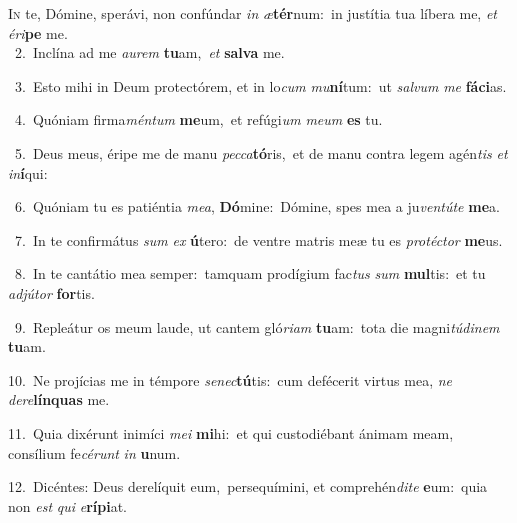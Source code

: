 \lettrine{\initial\textcolor{\initialcolor}{I}}{n} te, Dómine, sperávi, non confúndar \textit{in} \textit{æ}\-\textbf{tér}num:~\star in justítia tua líbera me, \textit{et} \textit{é}\-\textit{ri}\textbf{pe} me.\\
{\numbfont\textcolor{\numbcolor}{~2.}}~Inclína ad me \textit{au}\-\textit{rem} \textbf{tu}\-am,~\star \textit{et} \textbf{sal}\-\textbf{va} me.\par
{\numbfont\textcolor{\numbcolor}{~3.}}~Esto mihi in Deum protectórem, et in lo\textit{cum} \textit{mu}\-\textbf{ní}tum:~\star ut \textit{sal}\-\textit{vum} \textit{me} \textbf{fá}\-\textbf{ci}as.\par
{\numbfont\textcolor{\numbcolor}{~4.}}~Quóniam firma\-\textit{mén}\-\textit{tum} \textbf{me}\-um,~\star et refúgi\textit{um} \textit{me}\-\textit{um} \textbf{es} tu.\par
{\numbfont\textcolor{\numbcolor}{~5.}}~Deus meus, éripe me de manu \textit{pec}\-\textit{ca}\textbf{tó}ris,~\star et de manu contra legem agén\textit{tis} \textit{et} \textit{in}\-\textbf{í}qui:\par
{\numbfont\textcolor{\numbcolor}{~6.}}~Quóniam tu es patiéntia \textit{me}\-\textit{a}, \textbf{Dó}\-mine:~\star Dómine, spes mea a ju\-\textit{ven}\-\textit{tú}\textit{te} \textbf{me}\-a.\par
{\numbfont\textcolor{\numbcolor}{~7.}}~In te confirmátus \textit{sum} \textit{ex} \textbf{ú}\-tero:~\star de ventre matris meæ tu es \textit{pro}\-\textit{téc}\textit{tor} \textbf{me}\-us.\par
{\numbfont\textcolor{\numbcolor}{~8.}}~In te cantátio mea semper:~\dagger tamquam prodígium fac\textit{tus} \textit{sum} \textbf{mul}\-tis:~\star et tu \textit{ad}\-\textit{jú}\textit{tor} \textbf{for}\-tis.\par
{\numbfont\textcolor{\numbcolor}{~9.}}~Repleátur os meum laude, ut cantem gló\-\textit{ri}\-\textit{am} \textbf{tu}\-am:~\star tota die magni\-\textit{tú}\-\textit{di}\textit{nem} \textbf{tu}\-am.\par
{\numbfont\textcolor{\numbcolor}{10.}}~Ne projícias me in témpore \textit{se}\-\textit{nec}\textbf{tú}tis:~\star cum defécerit virtus mea, \textit{ne} \textit{de}\-\textit{re}\textbf{lín}\textbf{quas} me.\par
{\numbfont\textcolor{\numbcolor}{11.}}~Quia dixérunt inimíci \textit{me}\-\textit{i} \textbf{mi}\-hi:~\star et qui custodiébant ánimam meam, consílium fe\-\textit{cé}\-\textit{runt} \textit{in} \textbf{u}\-num.\par
{\numbfont\textcolor{\numbcolor}{12.}}~Dicéntes: Deus derelíquit eum,~\dagger persequímini, et comprehén\-\textit{di}\-\textit{te} \textbf{e}\-um:~\star quia non \textit{est} \textit{qui} \textit{e}\-\textbf{rí}\textbf{pi}at.\par
